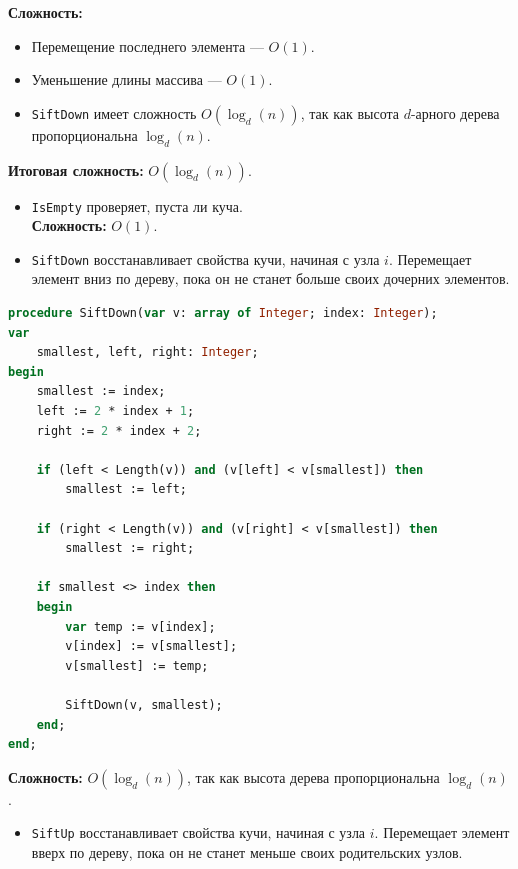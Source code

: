 \textbf{Сложность:}
\begin{itemize}
    \item Перемещение последнего элемента — $O(1)$.
    \item Уменьшение длины массива — $O(1)$.
    \item \texttt{SiftDown} имеет сложность $O(\log_d(n))$, так как высота $d$-арного дерева пропорциональна $\log_d(n)$.
\end{itemize}
\textbf{Итоговая сложность:} $O(\log_d(n))$.

\begin{itemize}[label=•, labelsep=1em]
    \item \texttt{IsEmpty} проверяет, пуста ли куча.\\
    \textbf{Сложность:} $O(1)$.
\end{itemize}

\begin{itemize}[label=•, labelsep=1em]
    \item \texttt{SiftDown} восстанавливает свойства кучи, начиная с узла $i$. Перемещает элемент вниз по дереву, пока он не станет больше своих дочерних элементов.
\end{itemize}

\begin{lstlisting}[language=Pascal]
procedure SiftDown(var v: array of Integer; index: Integer);
var
    smallest, left, right: Integer;
begin
    smallest := index;
    left := 2 * index + 1;
    right := 2 * index + 2;

    if (left < Length(v)) and (v[left] < v[smallest]) then
        smallest := left;

    if (right < Length(v)) and (v[right] < v[smallest]) then
        smallest := right;

    if smallest <> index then
    begin
        var temp := v[index];
        v[index] := v[smallest];
        v[smallest] := temp;

        SiftDown(v, smallest);
    end;
end;
\end{lstlisting}

\textbf{Сложность:} $O(\log_d(n))$, так как высота дерева пропорциональна $\log_d(n)$.

\begin{itemize}[label=•, labelsep=1em]
    \item \texttt{SiftUp} восстанавливает свойства кучи, начиная с узла $i$. Перемещает элемент вверх по дереву, пока он не станет меньше своих родительских узлов.
\end{itemize}

